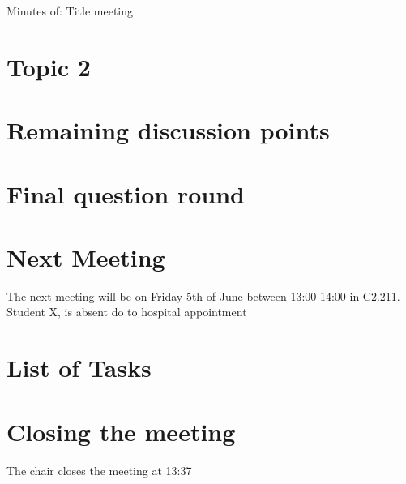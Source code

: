 \documentclass[11pt,a4paper]{article}
\begin{document}
\begin{Minutes}{Minutes of: Title meeting}
\section{Topic 2}

\section{Remaining discussion points} %

\section{Final question round}%

\section{Next Meeting}%
The next meeting will be on Friday 5th of June between 13:00-14:00 in C2.211. 
Student X, is absent do to hospital appointment

\section{List of Tasks}
\listoftasks

\section{Closing the meeting}
The chair closes the meeting at 13:37


\end{Minutes}
\end{document}
